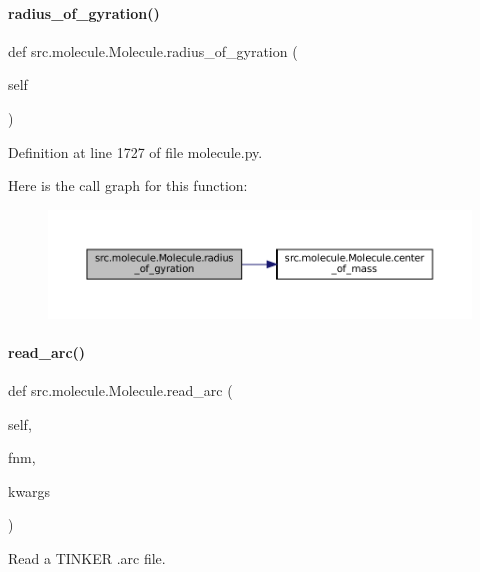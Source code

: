 \paragraph{\texorpdfstring{radius\+\_\+of\+\_\+gyration()}{radius\_of\_gyration()}}
{\footnotesize\ttfamily def src.\+molecule.\+Molecule.\+radius\+\_\+of\+\_\+gyration (\begin{DoxyParamCaption}\item[{}]{self }\end{DoxyParamCaption})}



Definition at line 1727 of file molecule.\+py.

Here is the call graph for this function\+:
\nopagebreak
\begin{figure}[H]
\begin{center}
\leavevmode
\includegraphics[width=350pt]{classsrc_1_1molecule_1_1Molecule_a972ec8931555662db70e0f6acaa009ca_cgraph}
\end{center}
\end{figure}
\mbox{\label{classsrc_1_1molecule_1_1Molecule_a7e4057a5d9f4bb4a62cef21680f91327}} 
\paragraph{\texorpdfstring{read\+\_\+arc()}{read\_arc()}}
{\footnotesize\ttfamily def src.\+molecule.\+Molecule.\+read\+\_\+arc (\begin{DoxyParamCaption}\item[{}]{self,  }\item[{}]{fnm,  }\item[{}]{kwargs }\end{DoxyParamCaption})}



Read a T\+I\+N\+K\+ER .arc file. 


